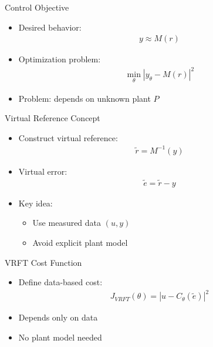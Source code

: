 \documentclass[hyperref={pdfpagemode=FullScreen},aspectratio=169]{beamer}
\begin{document}

\begin{frame}{Control Objective}
\begin{itemize}
\item Desired behavior:
\begin{align}
y \approx M(r)
\end{align}
\item Optimization problem:
\begin{align}
\min_\theta | y_\theta - M(r) |^2
\end{align}
\item Problem: depends on unknown plant $P$
\end{itemize}
\end{frame}


\begin{frame}{Virtual Reference Concept}
\begin{itemize}
\item Construct virtual reference:
\begin{align}
\tilde{r} = M^{-1}(y)
\end{align}
\item Virtual error:
\begin{align}
\tilde{e} = \tilde{r} - y
\end{align}
\item Key idea:
\begin{itemize}
\item Use measured data $(u, y)$
\item Avoid explicit plant model
\end{itemize}
\end{itemize}
\end{frame}


\begin{frame}{VRFT Cost Function}
\begin{itemize}
\item Define data-based cost:
\begin{align}
J_{VRFT}(\theta) = | u - C_\theta(\tilde{e}) |^2
\end{align}
\item Depends only on data
\item No plant model needed
\end{itemize}
\end{frame}
\end{document}
